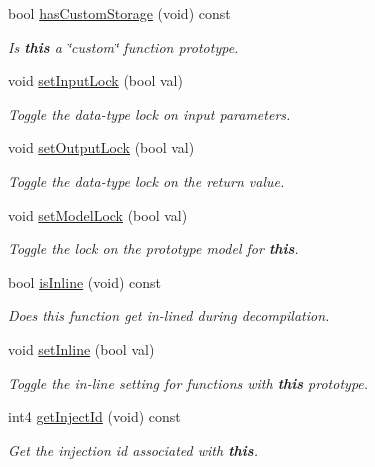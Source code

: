 \begin{DoxyCompactItemize}
bool \mbox{\hyperlink{class_func_proto_a662b2cce15487591fabd9632a335986c}{has\+Custom\+Storage}} (void) const
\begin{DoxyCompactList}\small\item\em Is {\bfseries{this}} a \char`\"{}custom\char`\"{} function prototype. \end{DoxyCompactList}\item 
void \mbox{\hyperlink{class_func_proto_a4afe216709633a3b075111d6f1b7148f}{set\+Input\+Lock}} (bool val)
\begin{DoxyCompactList}\small\item\em Toggle the data-\/type lock on input parameters. \end{DoxyCompactList}\item 
void \mbox{\hyperlink{class_func_proto_a7593a0880a632bce714a376244ef4f9a}{set\+Output\+Lock}} (bool val)
\begin{DoxyCompactList}\small\item\em Toggle the data-\/type lock on the return value. \end{DoxyCompactList}\item 
void \mbox{\hyperlink{class_func_proto_acc303c449c418dd875319c6f6cd9436f}{set\+Model\+Lock}} (bool val)
\begin{DoxyCompactList}\small\item\em Toggle the lock on the prototype model for {\bfseries{this}}. \end{DoxyCompactList}\item 
bool \mbox{\hyperlink{class_func_proto_a1195921be7caf4244970a23b0eafef67}{is\+Inline}} (void) const
\begin{DoxyCompactList}\small\item\em Does this function get {\itshape in-\/lined} during decompilation. \end{DoxyCompactList}\item 
void \mbox{\hyperlink{class_func_proto_a843bc3ca11536028c5cb00ce5479182d}{set\+Inline}} (bool val)
\begin{DoxyCompactList}\small\item\em Toggle the {\itshape in-\/line} setting for functions with {\bfseries{this}} prototype. \end{DoxyCompactList}\item 
int4 \mbox{\hyperlink{class_func_proto_a88af8e37c1ddb25fd9d6d8322ec436c6}{get\+Inject\+Id}} (void) const
\begin{DoxyCompactList}\small\item\em Get the injection id associated with {\bfseries{this}}. \end{DoxyCompactList}\item 

\end{DoxyCompactItemize}
